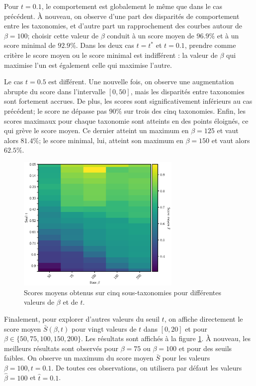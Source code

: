 Pour $t=0.1$, le comportement est globalement le même que dans le cas précédent. À nouveau, on observe d'une part des disparités de comportement entre les taxonomies, et d'autre part un rapprochement des courbes autour de $\beta=100$; choisir cette valeur de $\beta$ conduit à un score moyen de $96.9\%$ et à un score minimal de $92.9\%$. Dans les deux cas $t=t^*$ et $t=0.1$, prendre comme critère le score moyen ou le score minimal est indifférent : la valeur de $\beta$ qui maximise l'un est également celle qui maximise l'autre.

Le cas $t=0.5$ est différent. Une nouvelle fois, on observe une augmentation abrupte du score dans l'intervalle $[0, 50]$, mais les disparités entre taxonomies sont fortement accrues. De plus, les scores sont significativement inférieurs au cas précédent; le score ne dépasse pas $90\%$ sur trois des cinq taxonomies. Enfin, les scores maximaux pour chaque taxonomie sont atteints en des points éloignés, ce qui grève le score moyen. Ce dernier atteint un maximum en $\beta=125$ et vaut alors $81.4\%$; le score minimal, lui, atteint son maximum en $\beta=150$ et vaut alors $62.5\%$.

\begin{figure}[h]
    \centering
    \includegraphics[width=0.7\textwidth]{fig/tb_heatmap.eps}
    \caption[Scores d'extraction moyens, pour différents $\beta$ et $t$]{Scores moyens obtenus sur cinq sous-taxonomies pour différentes valeurs de $\beta$ et de $t$.}
    \label{fig:betea-search-4}
\end{figure}

Finalement, pour explorer d'autres valeurs du seuil $t$, on affiche directement le score moyen $\bar{S}(\beta, t)$ pour vingt valeurs de $t$ dans $[0, 20]$ et pour $\beta \in \{50, 75, 100, 150, 200\}$. Les résultats sont affichés à la figure \ref{fig:betea-search-4}. À nouveau, les meilleurs résultats sont observés pour $\beta = 75$ ou $\beta=100$ et pour des seuils faibles. On observe un maximum du score moyen $\bar{S}$ pour les valeurs $\beta = 100, t = 0.1$. De toutes ces observations, on utilisera par défaut les valeurs $\hat{\beta} = 100$ et $\hat{t} = 0.1$.

